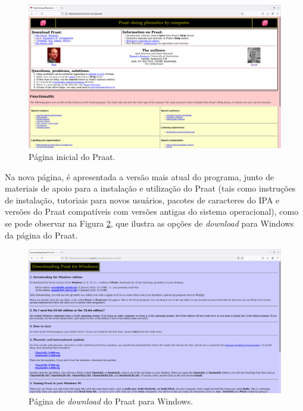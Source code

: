 \documentclass[portuguese]{textolivre}
\begin{document}
\begin{figure}[htbp]
 \centering
 \includegraphics[width=1\textwidth]{Fig1.png}
 \caption{Página inicial do Praat.}
 \label{fig1}
\end{figure}

Na nova página, é apresentada a versão mais atual do programa, junto de materiais de apoio para a instalação e utilização do Praat (tais como instruções de instalação, tutoriais para novos usuários, pacotes de caracteres do IPA e versões do Praat compatíveis com versões antigas do sistema operacional), como se pode observar na Figura \ref{fig2}, que ilustra as opções de \textit{download} para Windows da página do Praat. 

\begin{figure}[H]
    \centering
    \includegraphics[width=1\textwidth]{Fig2.png}
    \caption{Página de \textit{download} do Praat para Windows.}
    \label{fig2}
\end{figure}
\end{document}
